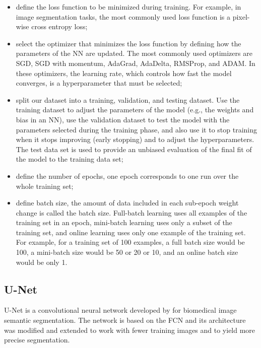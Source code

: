 \begin{itemize}
    \item define the loss function to be minimized during training. For example, in image segmentation tasks, the most commonly used loss function is a pixel-wise cross entropy loss;
    \item select the optimizer that minimizes the loss function by defining how the parameters of the \ac{NN} are updated. The most commonly used optimizers are \ac{SGD}, \ac{SGD} with momentum, \ac{AdaGrad}, \ac{AdaDelta}, RMSProp, and \ac{ADAM}. In these optimizers, the learning rate, which controls how fast the model converges, is a hyperparameter that must be selected;
    \item split our dataset into a training, validation, and testing dataset. Use the training dataset to adjust the parameters of the model (e.g., the weights and bias in an \ac{NN}), use the validation dataset to test the model with the parameters selected during the training phase, and also use it to stop training when it stops improving (early stopping) and to adjust the hyperparameters. The test data set is used to provide an unbiased evaluation of the final fit of the model to the training data set;
    \item define the number of epochs, one epoch corresponds to one run over the whole training set;
    \item define batch size, the amount of data included in each sub-epoch weight change is called the batch size. Full-batch learning uses all examples of the training set in an epoch, mini-batch learning uses only a subset of the training set, and online learning uses only one example of the training set. For example, for a training set of 100 examples, a full batch size would be 100, a mini-batch size would be 50 or 20 or 10, and an online batch size would be only 1.
    
\end{itemize}



\subsection{U-Net}

U-Net is a convolutional neural network developed by \citet{Unet:2D} for biomedical image semantic segmentation. The network is based on the \ac{FCN} \cite{fcn} and its architecture was modified and extended to work with fewer training images and to yield more precise segmentation. 

